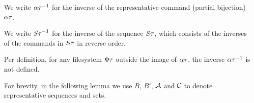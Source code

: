 
\begin{mydef}
We write $\alpha\tau^{-1}$ for
the inverse of the representative command (partial bijection) $\alpha\tau$.

We write ${S\tau}^{-1}$ for the inverse of the sequence $S\tau$, which consists of the inverses of the commands in $S\tau$
in reverse order.
\end{mydef}
Per definition, for any filesystem $\Phi\tau$ outside the image of $\alpha\tau$, the inverse $\alpha\tau^{-1}$ is not defined.


For brevity, in the following lemma we use $B$, $B'$, $\mathcal{A}$ and $\mathcal{C}$ to denote
representative sequences and sets.

\newcommand{\ia}{\sqs{A}}
\newcommand{\ic}{\sqs{C}}
\newcommand{\ibi}{B^{-1}}

